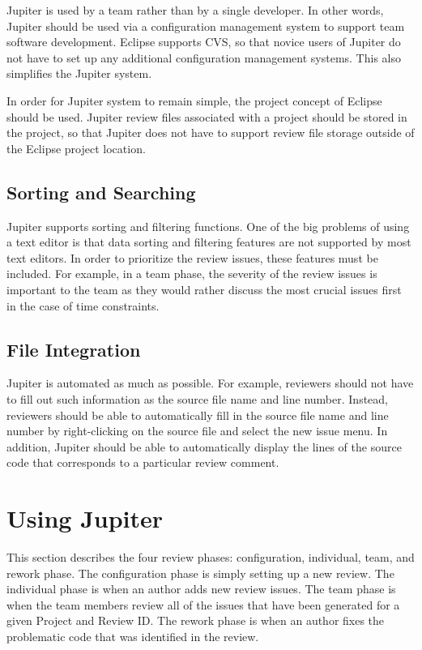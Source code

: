 Jupiter is used by a team rather than by a single developer. In other words, Jupiter should be used via a configuration management system to support team software development. Eclipse supports CVS, so that novice users of Jupiter do not have to set up any additional configuration management systems. This also simplifies the Jupiter system.

In order for Jupiter system to remain simple, the project concept of Eclipse should be used. Jupiter review files associated with a project should be stored in the project, so that Jupiter does not have to support review file storage outside of the Eclipse project location.

\subsection{Sorting and Searching}
\label{subsec:sorting-and-searching}

Jupiter supports sorting and filtering functions. One of the big problems of using a text editor is that data sorting and filtering features are not supported by most text editors. In order to prioritize the review issues, these features must be included. For example, in a team phase, the severity of the review issues is important to the team as they would rather discuss the most crucial issues first in the case of time constraints.

\subsection{File Integration}
\label{subsec:file-integration}

Jupiter is automated as much as possible. For example, reviewers should not have to fill out such information as the source file name and line number. Instead, reviewers should be able to automatically fill in the source file name and line number by right-clicking on the source file and select the new issue menu. In addition, Jupiter should be able to automatically display the lines of the source code that corresponds to a particular review comment.

\section{Using Jupiter}
\label{subsec:using-jupiter}

This section describes the four review phases: configuration, individual, team, and rework phase. The configuration phase is simply setting up a new review. The individual phase is when an author adds new review issues. The team phase is when the team members review all of the issues that have been generated for a given Project and Review ID. The rework phase is when an author fixes the problematic code that was identified in the review. 

